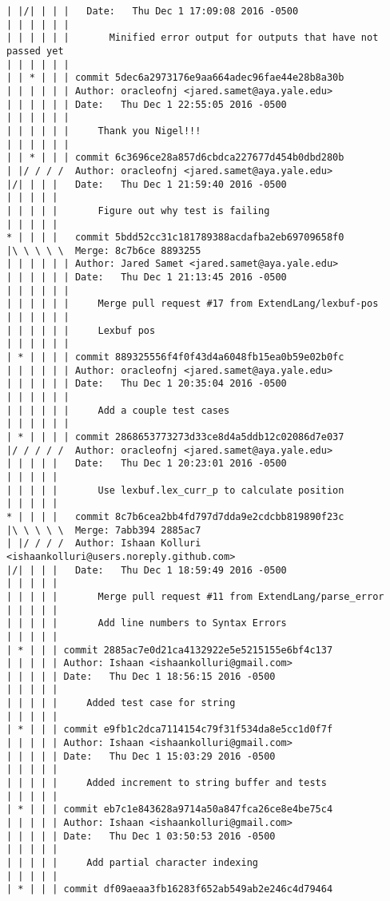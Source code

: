 \begin{lstlisting}
| |/| | | |   Date:   Thu Dec 1 17:09:08 2016 -0500
| | | | | |   
| | | | | |       Minified error output for outputs that have not passed yet
| | | | | |       
| | * | | | commit 5dec6a2973176e9aa664adec96fae44e28b8a30b
| | | | | | Author: oracleofnj <jared.samet@aya.yale.edu>
| | | | | | Date:   Thu Dec 1 22:55:05 2016 -0500
| | | | | | 
| | | | | |     Thank you Nigel!!!
| | | | | |       
| | * | | | commit 6c3696ce28a857d6cbdca227677d454b0dbd280b
| |/ / / /  Author: oracleofnj <jared.samet@aya.yale.edu>
|/| | | |   Date:   Thu Dec 1 21:59:40 2016 -0500
| | | | |   
| | | | |       Figure out why test is failing
| | | | |        
* | | | |   commit 5bdd52cc31c181789388acdafba2eb69709658f0
|\ \ \ \ \  Merge: 8c7b6ce 8893255
| | | | | | Author: Jared Samet <jared.samet@aya.yale.edu>
| | | | | | Date:   Thu Dec 1 21:13:45 2016 -0500
| | | | | | 
| | | | | |     Merge pull request #17 from ExtendLang/lexbuf-pos
| | | | | |     
| | | | | |     Lexbuf pos
| | | | | |       
| * | | | | commit 889325556f4f0f43d4a6048fb15ea0b59e02b0fc
| | | | | | Author: oracleofnj <jared.samet@aya.yale.edu>
| | | | | | Date:   Thu Dec 1 20:35:04 2016 -0500
| | | | | | 
| | | | | |     Add a couple test cases
| | | | | |       
| * | | | | commit 2868653773273d33ce8d4a5ddb12c02086d7e037
|/ / / / /  Author: oracleofnj <jared.samet@aya.yale.edu>
| | | | |   Date:   Thu Dec 1 20:23:01 2016 -0500
| | | | |   
| | | | |       Use lexbuf.lex_curr_p to calculate position
| | | | |        
* | | | |   commit 8c7b6cea2bb4fd797d7dda9e2cdcbb819890f23c
|\ \ \ \ \  Merge: 7abb394 2885ac7
| |/ / / /  Author: Ishaan Kolluri <ishaankolluri@users.noreply.github.com>
|/| | | |   Date:   Thu Dec 1 18:59:49 2016 -0500
| | | | |   
| | | | |       Merge pull request #11 from ExtendLang/parse_error
| | | | |       
| | | | |       Add line numbers to Syntax Errors
| | | | |      
| * | | | commit 2885ac7e0d21ca4132922e5e5215155e6bf4c137
| | | | | Author: Ishaan <ishaankolluri@gmail.com>
| | | | | Date:   Thu Dec 1 18:56:15 2016 -0500
| | | | | 
| | | | |     Added test case for string
| | | | |      
| * | | | commit e9fb1c2dca7114154c79f31f534da8e5cc1d0f7f
| | | | | Author: Ishaan <ishaankolluri@gmail.com>
| | | | | Date:   Thu Dec 1 15:03:29 2016 -0500
| | | | | 
| | | | |     Added increment to string buffer and tests
| | | | |      
| * | | | commit eb7c1e843628a9714a50a847fca26ce8e4be75c4
| | | | | Author: Ishaan <ishaankolluri@gmail.com>
| | | | | Date:   Thu Dec 1 03:50:53 2016 -0500
| | | | | 
| | | | |     Add partial character indexing
| | | | |      
| * | | | commit df09aeaa3fb16283f652ab549ab2e246c4d79464

\end{lstlisting}
